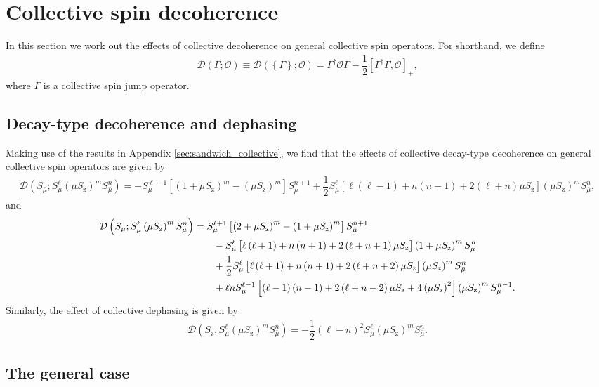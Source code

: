 \documentclass[pra,reprint,longbibliography]{revtex4-1}
\newcommand{\f}[2]{\dfrac{#1}{#2}} %
\newcommand{\p}[1]{\left(#1\right)} %
\renewcommand{\sp}[1]{\left[#1\right]} %
\renewcommand{\set}[1]{\left\{#1\right\}} %
\newcommand{\D}{\mathcal{D}}
\renewcommand{\O}{\mathcal{O}}
\newcommand{\z}{\text{z}}
\newcommand{\bmu}{{\bar\mu}}
\newcommand{\1}{\mathds{1}}
\begin{document}
\section{Collective spin decoherence}
\label{sec:decoherence_collective}

In this section we work out the effects of collective decoherence on
general collective spin operators.  For shorthand, we define
\begin{align}
  \D\p{\Gamma;\O}
  \equiv \D\p{\set{\Gamma};\O}
  = \Gamma^\dag \O \Gamma - \f12\sp{\Gamma^\dag \Gamma, \O}_+,
\end{align}
where $\Gamma$ is a collective spin jump operator.

\subsection{Decay-type decoherence and dephasing}
\label{sec:decay_dephasing_collective}

Making use of the results in Appendix \ref{sec:sandwich_collective},
we find that the effects of collective decay-type decoherence on
general collective spin operators are given by
\begin{align}
  \D\p{S_\bmu; S_\mu^\ell \p{\mu S_\z}^m S_\bmu^n}
  = -S_\mu^{\ell+1} \sp{\p{1+\mu S_\z}^m - \p{\mu S_\z}^m} S_\bmu^{n+1}
  + \f12 S_\mu^\ell \sp{\ell\p{\ell-1} + n\p{n-1}
    + 2\p{\ell+n}\mu S_\z} \p{\mu S_\z}^m S_\bmu^n,
\end{align}
and
\begin{align}
  \D\p{S_\mu; S_\mu^\ell \p{\mu S_\z}^m S_\bmu^n}
  &= S_\mu^{\ell+1} \sp{\p{2+\mu S_\z}^m-\p{1+\mu S_\z}^m}
  S_\bmu^{n+1} \notag \\
  &\qquad - S_\mu^\ell
  \sp{\ell\p{\ell+1} + n\p{n+1}+2\p{\ell+n+1}\mu S_\z}
  \p{1+\mu S_\z}^m S_\bmu^n \notag \\
  &\qquad + \f12 S_\mu^\ell
  \sp{\ell\p{\ell+1} + n\p{n+1}+2\p{\ell+n+2}\mu S_\z}
  \p{\mu S_\z}^m S_\bmu^n \notag \\
  &\qquad + \ell n S_\mu^{\ell-1}
  \sp{\p{\ell-1}\p{n-1}+2\p{\ell+n-2}\mu S_\z + 4\p{\mu S_\z}^2}
  \p{\mu S_\z}^m S_\bmu^{n-1}.
\end{align}
Similarly, the effect of collective dephasing is given by
\begin{align}
  \D\p{S_\z; S_\mu^\ell \p{\mu S_\z}^m S_\bmu^n}
  = -\f12 \p{\ell-n}^2 S_\mu^\ell \p{\mu S_\z}^m S_\bmu^n.
\end{align}


\subsection{The general case}
\label{sec:general_collective}
\end{document}
